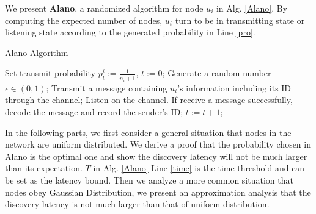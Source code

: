 We present \textbf{Alano}, a randomized algorithm for node $u_i$ in Alg. \ref{Alano}.
By computing the expected number of nodes, $u_i$ turn to be in transmitting state or listening state according to the generated probability in Line \ref{pro}.


\begin{algorithm}
\caption{Alano Algorithm}
\label{Alano}
\begin{algorithmic}[1]
\STATE Set transmit probability $p_t^i := \frac{1}{\widetilde{n_i}+1}$, $t := 0$;  \label{pro}
		\label{time}%
	\STATE Generate a random number $\epsilon \in (0,1)$;  
    		\STATE Transmit a message containing $u_i$'s information including its ID through the channel;
	\ELSE
    		\STATE Listen on the channel. If receive a message successfully, decode the message and record the sender's ID;
	\ENDIF
	\STATE $t:= t+1$;
\ENDWHILE
\end{algorithmic}
\end{algorithm}

In the following parts, we first consider a general situation that nodes in the network are uniform distributed. We derive a proof that the probability chosen in Alano is the optimal one and show the discovery latency will not be much larger than its expectation. $T$ in Alg. \ref{Alano} Line \ref{time} is the time threshold and can be set as the latency bound. Then we analyze a more common situation that nodes obey Gaussian Distribution, we present an approximation analysis that the discovery latency is not much larger than that of uniform distribution.


